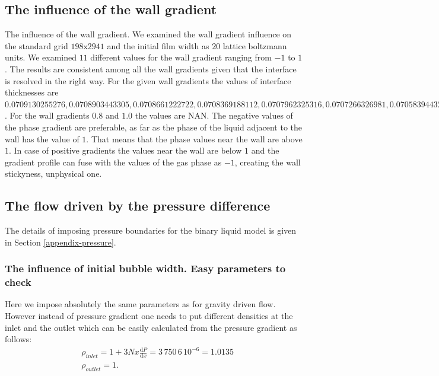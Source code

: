 \documentclass{article}
\begin{document}
\subsection{The influence of the wall gradient}
The influence of the wall gradient. We examined the wall gradient influence on
the standard grid $198\mathrm{x}2941$ and the initial film width as $20$
lattice boltzmann units. We examined $11$ different values for the wall
gradient ranging from $-1$ to $1$. The results are consistent among all the
wall gradients given that the interface is resolved in the right way. For the
given wall gradients the values of interface thicknesses are
$0.0709130255276, 0.0708903443305, 0.0708661222722,
0.0708369188112, 0.0707962325316, 0.0707266326981, 0.0705839443249,
0.0702489349415, 0.0697553433989$. For the wall gradients $0.8$ and $1.0$ the
values are NAN. The negative values of the phase gradient are preferable, as
far as the phase of the liquid adjacent to the wall has the value of $1$. That
means that the phase values near the wall are above $1$. In case of positive
gradients the values near the wall are below $1$ and the gradient profile can
fuse with the values of the gas phase as $-1$, creating the wall stickyness,
unphysical one.


\subsection{The flow driven by the pressure difference}
The details of imposing pressure boundaries for the binary liquid model is
given in Section \ref{appendix-pressure}.  

\subsubsection{The influence of initial bubble width. Easy parameters to check}
Here we impose absolutely the same parameters as for gravity driven flow.
However instead of pressure gradient one needs to put different densities at
the inlet and the outlet which can be easily calculated from the pressure
gradient as follows:
\begin{equation}
\begin{aligned}
&\rho_{inlet}=1+3 Nx \frac{\mathrm{d}P}{\mathrm{d}x}=3\, 750\, 6\,
10^{-6}=1.0135\\
&\rho_{outlet}=1.
\end{aligned}
\end{equation}
\end{document}
